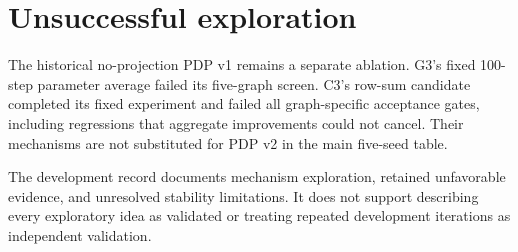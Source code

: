 \section{Unsuccessful exploration}
The historical no-projection PDP v1 remains a separate ablation. G3's fixed 100-step parameter average failed its five-graph screen. C3's row-sum candidate completed its fixed experiment and failed all graph-specific acceptance gates, including regressions that aggregate improvements could not cancel. Their mechanisms are not substituted for PDP v2 in the main five-seed table.

The development record documents mechanism exploration, retained unfavorable evidence, and unresolved stability limitations. It does not support describing every exploratory idea as validated or treating repeated development iterations as independent validation.
